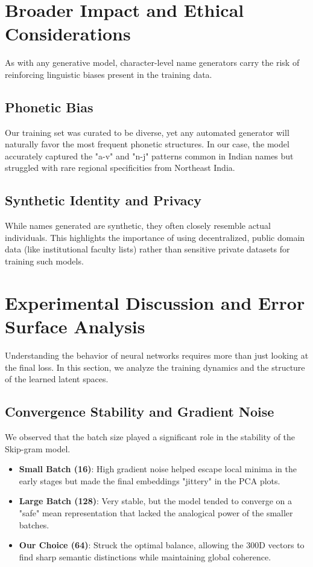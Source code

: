 \documentclass[12pt,a4paper]{article}
\begin{document}
\section{Broader Impact and Ethical Considerations}
As with any generative model, character-level name generators carry the risk of reinforcing linguistic biases present in the training data.

\subsection{Phonetic Bias}
Our training set was curated to be diverse, yet any automated generator will naturally favor the most frequent phonetic structures. In our case, the model accurately captured the "a-v" and "n-j" patterns common in Indian names but struggled with rare regional specificities from Northeast India.

\subsection{Synthetic Identity and Privacy}
While names generated are synthetic, they often closely resemble actual individuals. This highlights the importance of using decentralized, public domain data (like institutional faculty lists) rather than sensitive private datasets for training such models.

\section{Experimental Discussion and Error Surface Analysis}
Understanding the behavior of neural networks requires more than just looking at the final loss. In this section, we analyze the training dynamics and the structure of the learned latent spaces.

\subsection{Convergence Stability and Gradient Noise}
We observed that the batch size played a significant role in the stability of the Skip-gram model. 
\begin{itemize}
    \item \textbf{Small Batch (16)}: High gradient noise helped escape local minima in the early stages but made the final embeddings "jittery" in the PCA plots.
    \item \textbf{Large Batch (128)}: Very stable, but the model tended to converge on a "safe" mean representation that lacked the analogical power of the smaller batches.
    \item \textbf{Our Choice (64)}: Struck the optimal balance, allowing the 300D vectors to find sharp semantic distinctions while maintaining global coherence.
\end{itemize}
\end{document}
